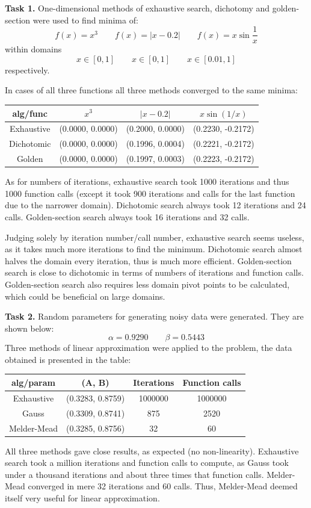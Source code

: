 \documentclass[12pt, a4paper]{article}
\begin{document}
\textbf{Task 1.} One-dimensional methods of exhaustive search, dichotomy and golden-section were used to find minima of:
\[ f(x) = x^3 \qquad f(x) = |x-0.2| \qquad f(x) = x\sin \frac{1}{x} \]
within domains
\[ x\in [0,1] \qquad x\in [0,1] \qquad x\in [0.01, 1] \]
respectively.

In cases of all three functions all three methods converged to the same minima:
\begin{center}
\begin{tabular}{cccc}
\hline
alg/func   & $x^3$            & $|x-0.2|$        & $x\sin (1/x)$     \\ \hline
Exhaustive & (0.0000, 0.0000) & (0.2000, 0.0000) & (0.2230, -0.2172) \\
Dichotomic & (0.0000, 0.0000) & (0.1996, 0.0004) & (0.2221, -0.2172) \\
Golden     & (0.0000, 0.0000) & (0.1997, 0.0003) & (0.2223, -0.2172) \\ \hline
\end{tabular}
\end{center}
As for numbers of iterations, exhaustive search took 1000 iterations and thus 1000 function calls (except it took 900 iterations and calls for the last function due to the narrower domain). Dichotomic search always took 12 iterations and 24 calls. Golden-section search always took 16 iterations and 32 calls.

Judging solely by iteration number/call number, exhaustive search seems useless, as it takes much more iterations to find the minimum. Dichotomic search almost halves the domain every iteration, thus is much more efficient. Golden-section search is close to dichotomic in terms of numbers of iterations and function calls. Golden-section search also requires less domain pivot points to be calculated, which could be beneficial on large domains.

\textbf{Task 2.} Random parameters for generating noisy data were generated. They are shown below:
\[ \alpha = 0.9290 \qquad \beta = 0.5443 \]
Three methods of linear approximation were applied to the problem, the data obtained is presented in the table:
\begin{center}
\begin{tabular}{cccc}
\hline
alg/param   & (A, B)           & Iterations & Function calls \\ \hline
Exhaustive  & (0.3283, 0.8759) & 1000000    & 1000000        \\
Gauss       & (0.3309, 0.8741) & 875        & 2520           \\
Melder-Mead & (0.3285, 0.8756) & 32         & 60             \\ \hline
\end{tabular}
\end{center}
All three methods gave close results, as expected (no non-linearity). Exhaustive search took a million iterations and function calls to compute, as Gauss took under a thousand iterations and about three times that function calls. Melder-Mead converged in mere 32 iterations and 60 calls. Thus, Melder-Mead deemed itself very useful for linear approximation.
\end{document}
